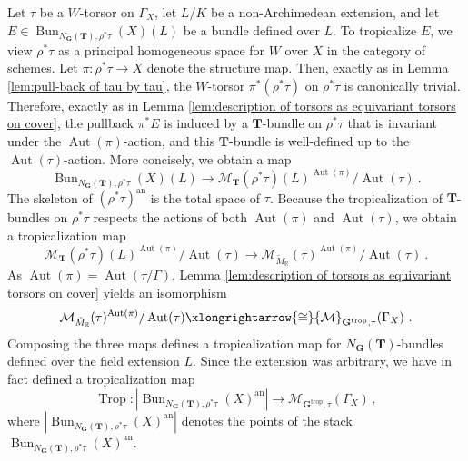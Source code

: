 \documentclass[10pt, a4paper]{amsart}
\theoremstyle{definition}
\theoremstyle{myitemstyle}
\newcommand{\R}{\mathbb{R}}
\newcommand{\Mcheck}{{\check{M}}}
\newcommand{\bfG}{\mathbf{G}}
\newcommand{\bfT}{\mathbf{T}}
\newcommand{\mc}[1]{{\mathcal{#1}}}
\DeclareMathOperator{\Aut}{Aut}
\DeclareMathOperator{\Trop}{Trop}
\DeclareMathOperator{\Bun}{Bun}
\newcommand{\an}{\mathrm{an}}
\newcommand{\trop}{{\mathrm{trop}}}
\begin{document}
Let $\tau$ be a $W$-torsor on $\Gamma_X$, let $L/K$ be a non-Archimedean extension, and let $E\in \Bun_{N_\bfG(\bfT),\rho^*\tau}(X)(L)$ be a bundle defined over $L$. To tropicalize $E$, we view $\rho^*\tau$ as a principal homogeneous space for $W$ over $X$ in the category of schemes. Let $\pi\colon\rho^*\tau\to X$ denote the structure map. Then, exactly as in Lemma \ref{lem:pull-back of tau by tau}, the $W$-torsor $\pi^*(\rho^*\tau)$ on $\rho^*\tau$ is canonically trivial. Therefore, exactly as in Lemma \ref{lem:description of torsors as equivariant torsors on cover}, the pullback $\pi^*E$ is induced by a $\bfT$-bundle on $\rho^*\tau$ that is invariant under the $\Aut(\pi)$-action, and this $\bfT$-bundle is well-defined up to the $\Aut(\tau)$-action. 
More concisely, we obtain a map
\[
\Bun_{N_\bfG(\bfT),\rho^*\tau}(X)(L)\longrightarrow \mc M_{\bfT}(\rho^*\tau)(L)^{\Aut(\pi)}/\Aut(\tau) \ .
\]
The skeleton of $(\rho^*\tau)^{\an}$ is the total space of $\tau$. Because the tropicalization of $\bfT$-bundles on $\rho^*\tau$ respects the actions of both $\Aut(\pi)$ and $\Aut(\tau)$, we obtain a tropicalization map
\[
\mc M_{\bfT}(\rho^*\tau)(L)^{\Aut(\pi)}/\Aut(\tau)\longrightarrow \mc M_{\Mcheck_\R}(\tau)^{\Aut(\pi)}/\Aut(\tau) \ .
\]
As $\Aut(\pi)=\Aut(\tau/\Gamma)$, Lemma \ref{lem:description of torsors as equivariant torsors on cover} yields an isomorphism
\[
\mc M_{\Mcheck_\R}(\tau)^{\Aut(\pi)}/\Aut(\tau)\xlongrightarrow{\cong} \mc M_{\bfG^\trop,\tau}(\Gamma_X) \ .
\]
Composing the three maps defines a tropicalization map for $N_\bfG(\bfT)$-bundles defined over the field extension $L$. 
Since the extension was arbitrary, we have in fact defined a tropicalization map
\[
\Trop\colon |\Bun_{N_\bfG(\bfT),\rho^*\tau}(X)^\an|\longrightarrow \mc M_{\bfG^\trop,\tau}(\Gamma_X)\, ,
\]
where $|\Bun_{N_\bfG(\bfT),\rho^*\tau}(X)^\an|$ denotes the points of the stack $\Bun_{N_\bfG(\bfT),\rho^*\tau}(X)^\an$. 
\end{document}
